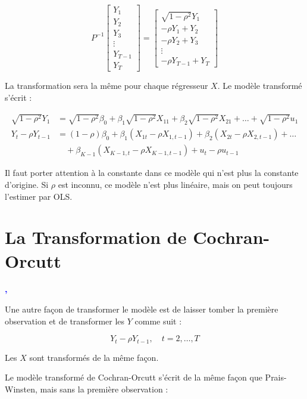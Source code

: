 \documentclass[14pt]{extarticle} %
\theoremstyle{definition}
\theoremstyle{plain}
\begin{document}
\[
P^{-1} \begin{bmatrix}
Y_1 \\
Y_2 \\
Y_3 \\
\vdots \\
Y_{T-1} \\
Y_T
\end{bmatrix}
=
\begin{bmatrix}
\sqrt{1 - \rho^2} Y_1 \\
-\rho Y_1 + Y_2 \\
-\rho Y_2 + Y_3 \\
\vdots \\
-\rho Y_{T-1} + Y_T
\end{bmatrix}
\]

La transformation sera la même pour chaque régresseur $X$. Le modèle transformé s’écrit :

\begin{align}
\sqrt{1 - \rho^2} Y_1 &= \sqrt{1 - \rho^2} \beta_0 + \beta_1 \sqrt{1 - \rho^2} X_{11} + \beta_2 \sqrt{1 - \rho^2} X_{21} + \dots + \sqrt{1 - \rho^2} u_1 \label{eq:prais_winsten1} \\
Y_t - \rho Y_{t-1} &= (1 - \rho) \beta_0 + \beta_1 (X_{1t} - \rho X_{1,t-1}) + \beta_2 (X_{2t} - \rho X_{2,t-1}) + \dots \nonumber \\
&\quad + \beta_{K-1} (X_{K-1,t} - \rho X_{K-1,t-1}) + u_t - \rho u_{t-1} \label{eq:prais_winsten2}
\end{align}

Il faut porter attention à la constante dans ce modèle qui n’est plus la constante d’origine. Si $\rho$ est inconnu, ce modèle n’est plus linéaire, mais on peut toujours l’estimer par OLS.

\section{La Transformation de Cochran-Orcutt}

\textbf{\textcolor{blue}{\cite{gujarati2010}, \cite{wooldridge2010}}}

Une autre façon de transformer le modèle est de laisser tomber la première observation et de transformer les $Y$ comme suit :

\[
Y_t - \rho Y_{t-1}, \quad t = 2, \dots, T
\]

Les $X$ sont transformés de la même façon.

Le modèle transformé de Cochran-Orcutt s’écrit de la même façon que Prais-Winsten, mais sans la première observation :
\end{document}
